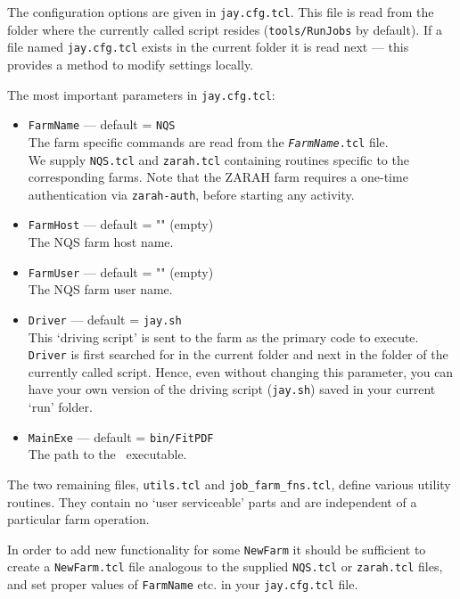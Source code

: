 \goodbreak
The configuration options are given in \verb'jay.cfg.tcl'.
This file is read from the folder where the currently called script resides
(\verb'tools/RunJobs' by default).
If a file named \verb'jay.cfg.tcl' exists in the current folder it is read next
--- this provides a method to modify settings locally.

The most important parameters in \verb'jay.cfg.tcl':
\begin{itemize}
\item
\verb'FarmName' --- default = \verb'NQS'\\
The farm specific commands are read from the \texttt{\textit{FarmName}.tcl} file.\\
We supply \verb'NQS.tcl' and \verb'zarah.tcl' containing
routines specific to the corresponding farms.
Note that the ZARAH farm requires a one-time authentication via \verb'zarah-auth',
before starting any activity.

\item
\verb'FarmHost' --- default = "" (empty)\\
The NQS farm host name.

\item
\verb'FarmUser' --- default = "" (empty)\\
The NQS farm user name.

\item
\verb'Driver' --- default = \verb'jay.sh'\\
This `driving script' is sent to the farm as the primary code to execute.
\verb'Driver' is first searched for in the current folder
and next in the folder of the currently called script.
Hence, even without changing this parameter, you can have your own version of the 
driving script (\verb'jay.sh') saved in your current `run' folder.

\item
\verb'MainExe' --- default = \verb'bin/FitPDF'\\
The path to the \fitter\ executable.

\end{itemize}

The two remaining files, \verb'utils.tcl' and \verb'job_farm_fns.tcl', define various utility routines.
They contain no `user serviceable' parts and are independent of a particular farm operation.

In order to add new functionality for some \verb'NewFarm' it should be sufficient to
create a \verb'NewFarm.tcl' file analogous to the supplied
\verb'NQS.tcl' or \verb'zarah.tcl' files, and set proper values of
\verb'FarmName' etc. in your \verb'jay.cfg.tcl' file.


